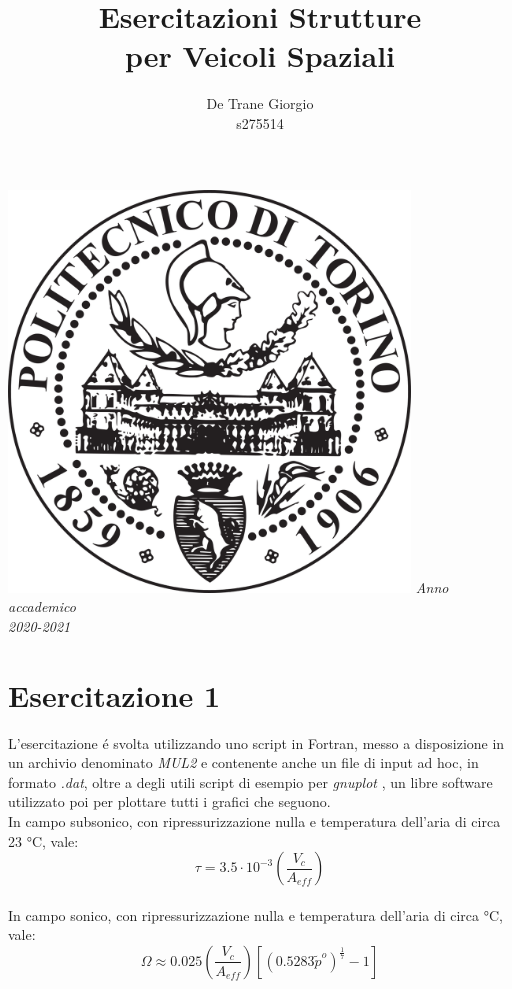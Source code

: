 \documentclass{article}
\author{De Trane Giorgio\\s275514}
\title{\textbf{Esercitazioni Strutture\\per Veicoli Spaziali}}
\begin{document}
    \maketitle
    \begin{center}
        \includegraphics[width=0.8\textwidth]{polito_logo.png}
        \linebreak
        \linebreak
        \textit{Anno accademico\\2020-2021}
    \end{center}
    \pagebreak
    \tableofcontents
    \pagebreak
    \section{Esercitazione 1\label{Esercitazione_1}}
    L'esercitazione é svolta utilizzando uno script in Fortran, messo a disposizione
    in un archivio denominato \textit{MUL2} \autocite*{MUL2} e contenente anche un file di input ad hoc, in formato \textit{.dat},
    oltre a degli utili script di esempio per \textit{gnuplot} \autocite*{gnuplot}, un libre software utilizzato poi per plottare tutti i grafici che seguono.
    \\
    \linebreak 
    In campo subsonico, con ripressurizzazione
    nulla e temperatura dell'aria di circa 23 °C, vale:
        \\ 
        \begin{equation}
            \tau = 3.5 \cdot  10^{-3}\left ( \frac{V_c}{A_{eff}} \right )
        \end{equation}
        \\ 
        In campo sonico, con ripressurizzazione nulla e temperatura
        dell'aria di circa °C, vale:
        \\ 
        \begin{equation}
            \Omega \approx 0.025\left ( \frac{V_c}{A_{eff}} \right )\left [ (0.5283{\tilde{p}}^{o})^{\frac{1}{7}} - 1 \right ]
        \end{equation} 
        \\ 
\end{document}
